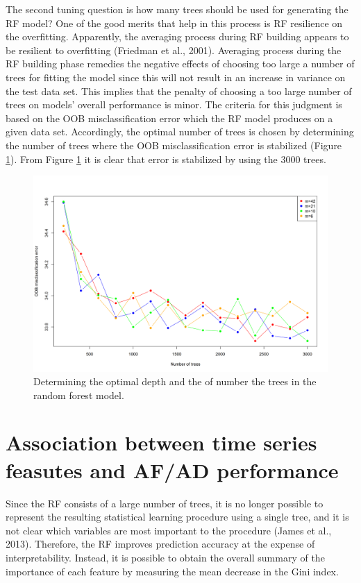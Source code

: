 \documentclass[]{elsarticle} %
\begin{document}
The second tuning question is how many trees should be used for
generating the RF model? One of the good merits that help in this
process is RF resilience on the overfitting. Apparently, the averaging
process during RF building appears to be resilient to overfitting
(Friedman et al., 2001). Averaging process during the RF building phase
remedies the negative effects of choosing too large a number of trees
for fitting the model since this will not result in an increase in
variance on the test data set. This implies that the penalty of choosing
a too large number of trees on models' overall performance is minor. The
criteria for this judgment is based on the OOB misclassification error
which the RF model produces on a given data set. Accordingly, the
optimal number of trees is chosen by determining the number of trees
where the OOB misclassification error is stabilized (Figure
\ref{fig:tree_depth}). From Figure \ref{fig:tree_depth} it is clear that
error is stabilized by using the 3000 trees.

\begin{figure}[H]

{\centering \includegraphics[width=0.9\linewidth]{img/300dpi/Fig_tree_depth_and_ntrees} 

}

\caption{Determining the optimal depth and the of number the trees in the random forest model.}\label{fig:tree_depth}
\end{figure}

\hypertarget{res}{%
\section{Association between time series feasutes and AF/AD
performance}\label{res}}

Since the RF consists of a large number of trees, it is no longer
possible to represent the resulting statistical learning procedure using
a single tree, and it is not clear which variables are most important to
the procedure (James et al., 2013). Therefore, the RF improves
prediction accuracy at the expense of interpretability. Instead, it is
possible to obtain the overall summary of the importance of each feature
by measuring the mean decrease in the Gini index.
\end{document}
